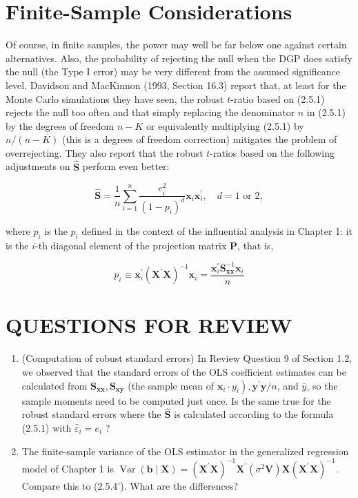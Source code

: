 \documentclass[10pt]{article}
\begin{document}
\section*{Finite-Sample Considerations}
Of course, in finite samples, the power may well be far below one against certain alternatives. Also, the probability of rejecting the null when the DGP does satisfy the null (the Type I error) may be very different from the assumed significance level. Davidson and MacKinnon (1993, Section 16.3) report that, at least for the Monte Carlo simulations they have seen, the robust $t$-ratio based on (2.5.1) rejects the null too often and that simply replacing the denominator $n$ in (2.5.1) by the degrees of freedom $n-K$ or equivalently multiplying (2.5.1) by $n /(n-K)$ (this is a degrees of freedom correction) mitigates the problem of overrejecting. They also report that the robust $t$-ratios based on the following adjustments on $\widehat{\mathbf{S}}$ perform even better:


\begin{equation*}
\widehat{\mathbf{S}}=\frac{1}{n} \sum_{i=1}^{n} \frac{e_{i}^{2}}{\left(1-p_{i}\right)^{d}} \mathbf{x}_{i} \mathbf{x}_{i}^{\prime}, \quad d=1 \text { or } 2, \tag{2.5.5}
\end{equation*}


where $p_{i}$ is the $p_{i}$ defined in the context of the influential analysis in Chapter 1: it is the $i$-th diagonal element of the projection matrix $\mathbf{P}$, that is,

$$
p_{i} \equiv \mathbf{x}_{i}^{\prime}\left(\mathbf{X}^{\prime} \mathbf{X}\right)^{-1} \mathbf{x}_{i}=\frac{\mathbf{x}_{i}^{\prime} \mathbf{S}_{\mathbf{x x}}^{-1} \mathbf{x}_{i}}{n}
$$

\section*{QUESTIONS FOR REVIEW}
\begin{enumerate}
  \item (Computation of robust standard errors) In Review Question 9 of Section 1.2, we observed that the standard errors of the OLS coefficient estimates can be calculated from $\mathbf{S}_{\mathbf{x x}}, \mathbf{S}_{\mathbf{x y}}$ (the sample mean of $\left.\mathbf{x}_{i} \cdot y_{i}\right), \mathbf{y}^{\prime} \mathbf{y} / n$, and $\bar{y}$, so the sample moments need to be computed just once. Is the same true for the robust standard errors where the $\widehat{\mathbf{S}}$ is calculated according to the formula (2.5.1) with $\hat{\varepsilon}_{i}=e_{i}$ ?
  \item The finite-sample variance of the OLS estimator in the generalized regression model of Chapter 1 is $\operatorname{Var}(\mathbf{b} \mid \mathbf{X})=\left(\mathbf{X}^{\prime} \mathbf{X}\right)^{-1} \mathbf{X}^{\prime}\left(\sigma^{2} \mathbf{V}\right) \mathbf{X}\left(\mathbf{X}^{\prime} \mathbf{X}\right)^{-1}$. Compare this to (2.5.4'). What are the differences?
\end{enumerate}
\end{document}
